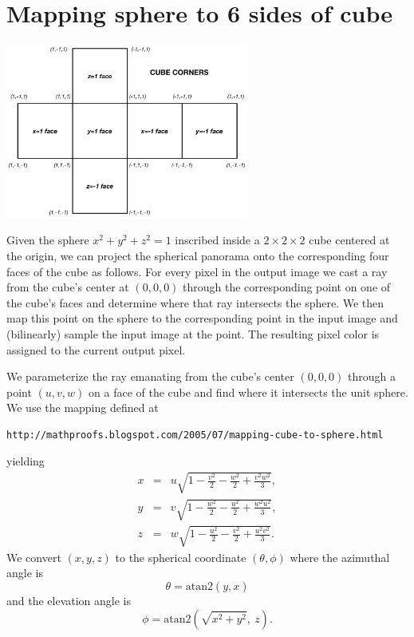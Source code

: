 \documentclass[11pt, oneside]{article}   	%
\begin{document}
\section{Mapping sphere to 6 sides of cube}  

\begin{center}
\includegraphics[width=0.6\textwidth]{cube_sphere} 
\end{center}      

Given the sphere $x^2 + y^2 + z^2= 1$ inscribed inside a $2 \times 2 \times 2$ cube
centered at the origin, we can project the spherical panorama onto the corresponding
four faces of the cube as follows.
For every pixel in the output image we cast a ray from the cube's center at $(0,0,0)$
through the corresponding point on one of the cube's faces and determine where that
ray intersects the sphere. We then map this point on the sphere to the corresponding
point in the input image and (bilinearly) sample the input image at the point. 
The resulting pixel color is assigned to the current output pixel.

We parameterize the ray emanating from 
the cube's center $(0,0,0)$ through a point $(u,v,w)$ on a face of the cube 
and find where it intersects the unit sphere. We use the mapping defined at
\begin{verbatim}
http://mathproofs.blogspot.com/2005/07/mapping-cube-to-sphere.html
\end{verbatim}
yielding
\begin{eqnarray}
x &=& u\sqrt{1 - \frac{v^2}{2} - \frac{w^2}{2} + \frac{v^2 w^2}{3}}, \\
y &=& v\sqrt{1 - \frac{w^2}{2} - \frac{u^2}{2} + \frac{w^2 u^2}{3}}, \\
z &=& w\sqrt{1 - \frac{u^2}{2} - \frac{v^2}{2} + \frac{u^2 v^2}{3}}.
\end{eqnarray}
We convert $(x,y,z)$ to the spherical coordinate $(\theta, \phi)$ where
the azimuthal angle is
\begin{equation}
\theta = \mbox{atan2}\left(y,x\right)
\end{equation}
and the elevation angle is
\begin{equation}
\phi = \mbox{atan2}\left(\sqrt{x^2+y^2},\ z\right).
\end{equation}
\end{document}
